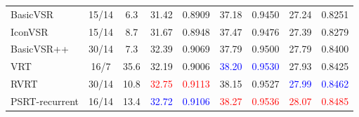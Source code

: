 \documentclass{article}
\begin{document}
\begin{table}[t]
{\begin{tabular}{l|c|c||cc|cc|cc}
    \midrule
    BasicVSR~\cite{chan2021basicvsr}& 15/14 & 6.3 & 31.42 & 0.8909 & 37.18 & 0.9450 & 27.24 & 0.8251\\
    IconVSR~\cite{chan2021basicvsr}&  15/14 & 8.7 & 31.67 & 0.8948 & 37.47 & 0.9476 & 27.39 & 0.8279 \\
    BasicVSR++~\cite{chan2021basicvsr++}&  30/14 & 7.3  & 32.39 & 0.9069 &  37.79 & 0.9500 & 27.79 & 0.8400\\
    VRT  &  16/7 & 35.6 & 32.19 & 0.9006 & \textcolor{blue}{38.20} & \textcolor{blue}{0.9530} & 27.93 & 0.8425\\
    RVRT \cite{liang2022recurrent} & 30/14 &  10.8 & \textcolor{red}{32.75} & \textcolor{red}{0.9113} & 38.15 & 0.9527 & \textcolor{blue}{27.99} & \textcolor{blue}{0.8462} \\
PSRT-recurrent  &  16/14 & 13.4 & \textcolor{blue}{32.72} & \textcolor{blue}{0.9106} & \textcolor{red}{38.27} & \textcolor{red}{0.9536} &\textcolor{red}{28.07}& \textcolor{red}{0.8485}\\
    \bottomrule
  \end{tabular}}
  \vspace{-4mm}
\end{table}
\end{document}
